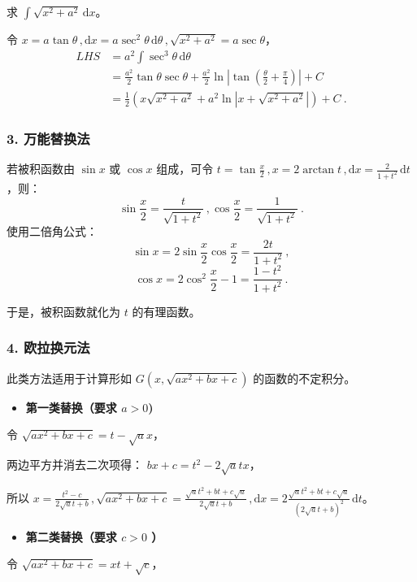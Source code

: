 \begin{example}{}
求 $\displaystyle{\int\sqrt{x^2+a^2}\,\mathrm{d}x}$。

令 $x=a\tan \theta\,,\mathrm{d}x=a\sec^2\theta\,\mathrm{d}\theta\,,\sqrt{x^2+a^2}=a\sec\theta$，
\begin{equation}
\begin{aligned}
LHS&=a^2\int \sec^3\theta\,\mathrm{d}\theta\\ &=\frac{a^2}{2}\tan\theta\sec\theta+\frac{a^2}{2}\ln\left|\tan\left(\frac{\theta}{2}+\frac{\pi}{4}\right)\right|+C\\ &=\frac{1}{2}\left(x\sqrt{x^2+a^2}+a^2\ln\left|x+\sqrt{x^2+a^2}\right|\right)+C~.
\end{aligned}
\end{equation}

\end{example}

\subsubsection{3. 万能替换法}
若被积函数由 $\sin x$ 或 $\cos x$ 组成，可令 $\displaystyle{t=\tan\frac{x}{2}\,,x=2\arctan t\,,\mathrm{d}x=\frac{2}{1+t^2}\,\mathrm{d}t}$ ，则：
$$\sin\frac{x}{2}=\frac{t}{\sqrt{1+t^2}}\,,\cos \frac{x}{2}=\frac{1}{\sqrt{1+t^2}}~.$$
使用二倍角公式：
$$\sin x=2\sin\frac{x}{2}\cos\frac{x}{2}=\frac{2t}{1+t^2}~,$$
$$ \cos x=2\cos^2\frac{x}{2}-1=\frac{1-t^2}{1+t^2}~.$$

于是，被积函数就化为 $t$ 的有理函数。

\subsubsection{4. 欧拉换元法}
此类方法适用于计算形如 $\displaystyle{G\left(x,\sqrt{ax^2+bx+c}\right)}$ 的函数的不定积分。

\begin{itemize}
\item \textbf{第一类替换（要求 $a>0$)}
\end{itemize}
令 $\sqrt{ax^2+bx+c}=t-\sqrt{a}x$，

两边平方并消去二次项得： $bx+c=t^2-2\sqrt{a}tx$，

所以 $\displaystyle{x=\frac{t^2-c}{2\sqrt{a}t+b}\,,\sqrt{ax^2+bx+c}=\frac{\sqrt{a}t^2+bt+c\sqrt{a}}{2\sqrt{a}t+b}\,,\mathrm{d}x=2\frac{\sqrt{a}t^2+bt+c\sqrt{a}}{(2\sqrt{a}t+b)^2}\,\mathrm{d}t}$。

\begin{itemize}
\item \textbf{第二类替换（要求 $c>0$ ）}
\end{itemize}
令 $\displaystyle{\sqrt{ax^2+bx+c}=xt+\sqrt{c}}$，

